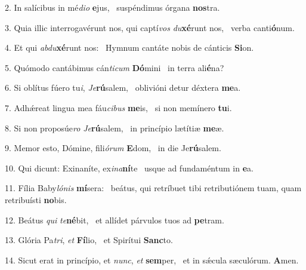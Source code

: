 2. In salícibus in mé\textit{di}\textit{o} \textbf{e}jus, \ast\  suspéndimus órgana \textbf{nos}tra.\

3. Quia illic interrogavérunt nos, qui captí\textit{vos} \textit{du}\textbf{xé}runt nos, \ast\  verba canti\textbf{ó}num.\

4. Et qui \textit{ab}\textit{du}\textbf{xé}runt nos: \ast\  Hymnum cantáte nobis de cánticis \textbf{Si}on.\

5. Quómodo cantábimus cán\textit{ti}\textit{cum} \textbf{Dó}mini \ast\  in terra ali\textbf{é}na?\

6. Si oblítus fúero tu\textit{i}, \textit{Je}\textbf{rú}salem, \ast\  oblivióni detur déxtera \textbf{me}a.\

7. Adhǽreat lingua mea fáu\textit{ci}\textit{bus} \textbf{me}is, \ast\  si non memínero \textbf{tu}i.\

8. Si non proposúe\textit{ro} \textit{Je}\textbf{rú}salem, \ast\  in princípio lætítiæ \textbf{me}æ.\

9. Memor esto, Dómine, fili\textit{ó}\textit{rum} \textbf{E}dom, \ast\  in die Je\textbf{rú}salem.\

10. Qui dicunt: Exinaníte, ex\textit{i}\textit{na}\textbf{ní}te \ast\  usque ad fundaméntum in \textbf{e}a.\

11. Fília Baby\textit{ló}\textit{nis} \textbf{mí}sera: \ast\  beátus, qui retríbuet tibi retributiónem tuam, quam retribuísti \textbf{no}bis.\

12. Beátus \textit{qui} \textit{te}\textbf{né}bit, \ast\  et allídet párvulos tuos ad \textbf{pe}tram.\

13. Glória Pa\textit{tri}, \textit{et} \textbf{Fí}lio, \ast\  et Spirítui \textbf{Sanc}to.\

14. Sicut erat in princípio, et \textit{nunc}, \textit{et} \textbf{sem}per, \ast\  et in sǽcula sæculórum. \textbf{A}men.\

